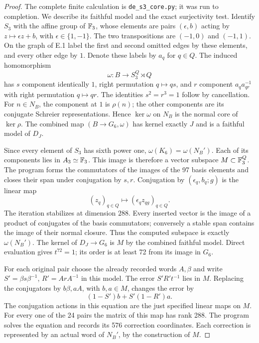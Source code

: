 \begin{proof}
The complete finite calculation is \texttt{de\_s3\_core.py}; it was
run to completion. We describe its faithful model and the exact
surjectivity test. Identify $S_3$ with the affine group of $\mathbb F_3$,
whose elements are pairs $(\epsilon,b)$ acting by
$z\mapsto\epsilon z+b$, with $\epsilon\in\{1,-1\}$.
The two transpositions are $(-1,0)$ and $(-1,1)$.
On the graph of E.1 label the first and second omitted edges by
these elements, and every other edge by $1$. Denote these labels
by $a_q$ for $q\in Q$. The induced homomorphism
\[
 \omega:B\longrightarrow S_3^Q\rtimes Q
\]
has $s$ component identically $1$, right permutation $q\mapsto qs$,
and $r$ component $a_q a_{qr}^{-1}$ with right permutation
$q\mapsto qr$. The identities $s^2=r^3=1$ follow by cancellation.
For $n\in N_B$, the component at $1$ is $\rho(n)$; the other
components are its conjugate Schreier representations. Hence
$\ker\omega$ on $N_B$ is the normal core of $\ker\rho$.
The combined map $(B\to G_6,\omega)$ has kernel exactly $J$ and
is a faithful model of $D_J$.

Since every element of $S_3$ has sixth power one,
$\omega(K_6)=\omega(N_B')$. Each of its components lies in
$A_3\simeq\mathbb F_3$. This image is therefore a vector subspace
$M\subset\mathbb F_3^Q$. The program forms the commutators of the images
of the 97 basis elements and closes their span under conjugation
by $s,r$. Conjugation by $(\epsilon_q,b_q;g)$ is the linear map
\[
 (z_q)_{q\in Q}\longmapsto
       (\epsilon_q z_{qg})_{q\in Q}.
\]
The iteration stabilizes at dimension $288$. Every inserted vector
is the image of a product of conjugates of the basis commutators;
conversely a stable span contains the image of their normal closure.
Thus the computed subspace is exactly $\omega(N_B')$.
The kernel of $D_J\to G_6$ is $M$ by the combined faithful model.
Direct evaluation gives $t^{72}=1$; its order is at least 72 from
its image in $G_6$.

For each original pair choose the already recorded words $A,\beta$
and write $S'=\beta s\beta^{-1}$, $R'=ArA^{-1}$ in this model.
The error $S'R't^{-1}$ lies in $M$. Replacing the conjugators by
$b\beta,aA$, with $b,a\in M$, changes the error by
\[
 (1-S')b+S'(1-R')a.
\]
The conjugation actions in this equation are the just specified
linear maps on $M$. For every one of the 24 pairs the matrix of
this map has rank 288. The program solves the equation and records
its 576 correction coordinates. Each correction is represented by
an actual word of $N_B'$, by the construction of $M$.


\end{proof}
